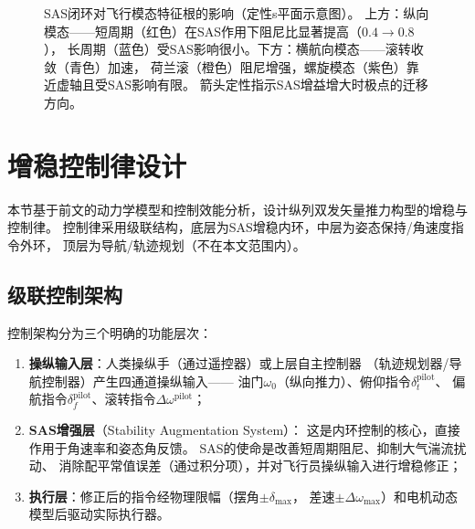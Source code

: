 \documentclass[a4paper,12pt]{ctexart}
\theoremstyle{plain}
\theoremstyle{definition}
\begin{document}
\begin{figure}[H]
\caption{SAS闭环对飞行模态特征根的影响（定性s平面示意图）。
上方：纵向模态——短周期（红色）在SAS作用下阻尼比显著提高（$0.4\to0.8$），
长周期（蓝色）受SAS影响很小。下方：横航向模态——滚转收敛（青色）加速，
荷兰滚（橙色）阻尼增强，螺旋模态（紫色）靠近虚轴且受SAS影响有限。
箭头定性指示SAS增益增大时极点的迁移方向。}
\label{fig:stability_poles}
\end{figure}

\section{增稳控制律设计}
\label{sec:control}

本节基于前文的动力学模型和控制效能分析，设计纵列双发矢量推力构型的增稳与控制律。
控制律采用级联结构，底层为SAS增稳内环，中层为姿态保持/角速度指令外环，
顶层为导航/轨迹规划（不在本文范围内）。

\subsection{级联控制架构}

控制架构分为三个明确的功能层次：

\begin{enumerate}[label=(\arabic*)]
    \item \textbf{操纵输入层}：人类操纵手（通过遥控器）或上层自主控制器
          （轨迹规划器/导航控制器）产生四通道操纵输入——
          油门$\omega_0$（纵向推力）、俯仰指令$\delta_t^{\text{pilot}}$、
          偏航指令$\delta_f^{\text{pilot}}$、滚转指令$\Delta\omega^{\text{pilot}}$；
    \item \textbf{SAS增强层}（Stability Augmentation System）：
          这是内环控制的核心，直接作用于角速率和姿态角反馈。
          SAS的使命是改善短周期阻尼、抑制大气湍流扰动、
          消除配平常值误差（通过积分项），并对飞行员操纵输入进行增稳修正；
    \item \textbf{执行层}：修正后的指令经物理限幅（摆角$\pm\delta_{\max}$，
          差速$\pm\Delta\omega_{\max}$）和电机动态模型后驱动实际执行器。
\end{enumerate}
\end{document}
